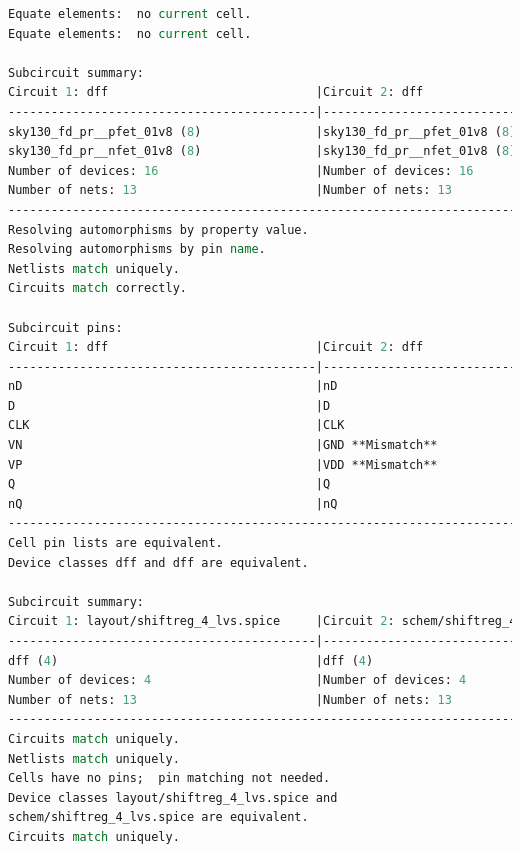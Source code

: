 \documentclass[11pt]{article}
\begin{document}
\begin{lstlisting}[language=tcl, caption=\textbf{Layout versus Schematic for 4-bit Shift Register}]
Equate elements:  no current cell.
Equate elements:  no current cell.

Subcircuit summary:
Circuit 1: dff                             |Circuit 2: dff                             
-------------------------------------------|-------------------------------------------
sky130_fd_pr__pfet_01v8 (8)                |sky130_fd_pr__pfet_01v8 (8)                
sky130_fd_pr__nfet_01v8 (8)                |sky130_fd_pr__nfet_01v8 (8)                
Number of devices: 16                      |Number of devices: 16                      
Number of nets: 13                         |Number of nets: 13                         
---------------------------------------------------------------------------------------
Resolving automorphisms by property value.
Resolving automorphisms by pin name.
Netlists match uniquely.
Circuits match correctly.

Subcircuit pins:
Circuit 1: dff                             |Circuit 2: dff                             
-------------------------------------------|-------------------------------------------
nD                                         |nD                                         
D                                          |D                                          
CLK                                        |CLK                                        
VN                                         |GND **Mismatch**                           
VP                                         |VDD **Mismatch**                           
Q                                          |Q                                          
nQ                                         |nQ                                         
---------------------------------------------------------------------------------------
Cell pin lists are equivalent.
Device classes dff and dff are equivalent.

Subcircuit summary:
Circuit 1: layout/shiftreg_4_lvs.spice     |Circuit 2: schem/shiftreg_4_lvs.spice      
-------------------------------------------|-------------------------------------------
dff (4)                                    |dff (4)                                    
Number of devices: 4                       |Number of devices: 4                       
Number of nets: 13                         |Number of nets: 13                         
---------------------------------------------------------------------------------------
Circuits match uniquely.
Netlists match uniquely.
Cells have no pins;  pin matching not needed.
Device classes layout/shiftreg_4_lvs.spice and 
schem/shiftreg_4_lvs.spice are equivalent.
Circuits match uniquely.

\end{lstlisting}
\end{document}
